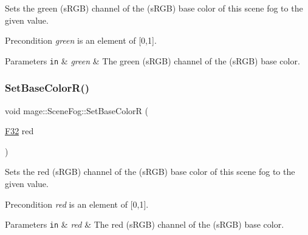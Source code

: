 Sets the green (s\+R\+GB) channel of the (s\+R\+GB) base color of this scene fog to the given value.

\begin{DoxyPrecond}{Precondition}
{\itshape green} is an element of \mbox{[}0,1\mbox{]}. 
\end{DoxyPrecond}

\begin{DoxyParams}[1]{Parameters}
\mbox{\tt in}  & {\em green} & The green (s\+R\+GB) channel of the (s\+R\+GB) base color. \\
\hline
\end{DoxyParams}
\hypertarget{classmage_1_1_scene_fog_abc74a9cd83300bb00ea6779ff5c9e5af}{}\label{classmage_1_1_scene_fog_abc74a9cd83300bb00ea6779ff5c9e5af} 
\subsubsection{\texorpdfstring{Set\+Base\+Color\+R()}{SetBaseColorR()}}
{\footnotesize\ttfamily void mage\+::\+Scene\+Fog\+::\+Set\+Base\+ColorR (\begin{DoxyParamCaption}\item[{\hyperlink{namespacemage_aa97e833b45f06d60a0a9c4fc22ae02c0}{F32}}]{red }\end{DoxyParamCaption})\hspace{0.3cm}{\ttfamily [noexcept]}}

Sets the red (s\+R\+GB) channel of the (s\+R\+GB) base color of this scene fog to the given value.

\begin{DoxyPrecond}{Precondition}
{\itshape red} is an element of \mbox{[}0,1\mbox{]}. 
\end{DoxyPrecond}

\begin{DoxyParams}[1]{Parameters}
\mbox{\tt in}  & {\em red} & The red (s\+R\+GB) channel of the (s\+R\+GB) base color. \\
\hline
\end{DoxyParams}
\hypertarget{classmage_1_1_scene_fog_abda38bdb0b9b658efdca7b94c2930ab1}{}\label{classmage_1_1_scene_fog_abda38bdb0b9b658efdca7b94c2930ab1} 
